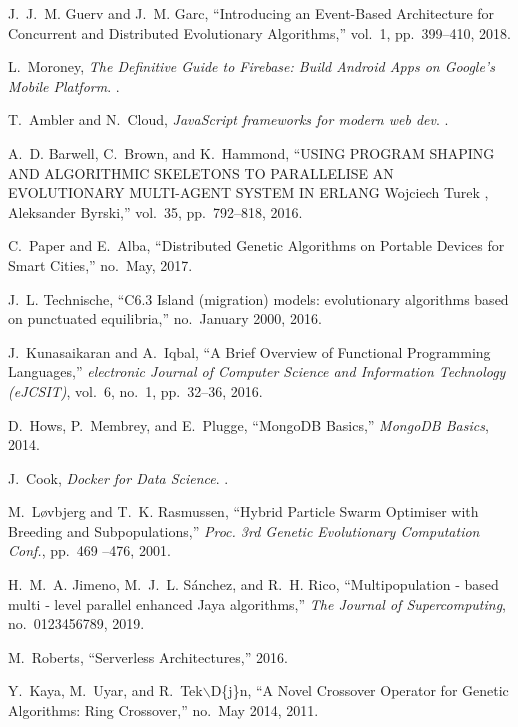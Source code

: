 \documentclass[runningheads]{llncs}
\begin{document}
\begin{thebibliography}{10}
    J.~J.~M. Guerv and J.~M. Garc, ``{Introducing an Event-Based Architecture for
      Concurrent and Distributed Evolutionary Algorithms},'' vol.~1, pp.~399--410,
      2018.
    
    L.~Moroney, {\em {The Definitive Guide to Firebase: Build Android Apps on
      Google's Mobile Platform}}.
    .
    
    T.~Ambler and N.~Cloud, {\em {JavaScript frameworks for modern web dev}}.
    .
    
    A.~D. Barwell, C.~Brown, and K.~Hammond, ``{USING PROGRAM SHAPING AND
      ALGORITHMIC SKELETONS TO PARALLELISE AN EVOLUTIONARY MULTI-AGENT SYSTEM IN
      ERLANG Wojciech Turek , Aleksander Byrski},'' vol.~35, pp.~792--818, 2016.
    
    C.~Paper and E.~Alba, ``{Distributed Genetic Algorithms on Portable Devices for
      Smart Cities},'' no.~May, 2017.
    
    J.~L. Technische, ``{C6.3 Island (migration) models: evolutionary algorithms
      based on punctuated equilibria},'' no.~January 2000, 2016.
    
    J.~Kunasaikaran and A.~Iqbal, ``{A Brief Overview of Functional Programming
      Languages},'' {\em electronic Journal of Computer Science and Information
      Technology (eJCSIT)}, vol.~6, no.~1, pp.~32--36, 2016.
    
    D.~Hows, P.~Membrey, and E.~Plugge, ``{MongoDB Basics},'' {\em MongoDB Basics},
      2014.
    
    J.~Cook, {\em {Docker for Data Science}}.
    .
    
    M.~L{\o}vbjerg and T.~K. Rasmussen, ``{Hybrid Particle Swarm Optimiser with
      Breeding and Subpopulations},'' {\em Proc. 3rd Genetic Evolutionary
      Computation Conf.}, pp.~469 --476, 2001.
    
    H.~M.~A. Jimeno, M.~J.~L. S{\'{a}}nchez, and R.~H. Rico, ``{Multipopulation ‑
      based multi ‑ level parallel enhanced Jaya algorithms},'' {\em The Journal
      of Supercomputing}, no.~0123456789, 2019.
    
    M.~Roberts, ``{Serverless Architectures},'' 2016.
    
    Y.~Kaya, M.~Uyar, and R.~Tek$\backslash$D{\{}j{\}}n, ``{A Novel Crossover
      Operator for Genetic Algorithms: Ring Crossover},'' no.~May 2014, 2011.
    
    \end{thebibliography}
\end{document}
